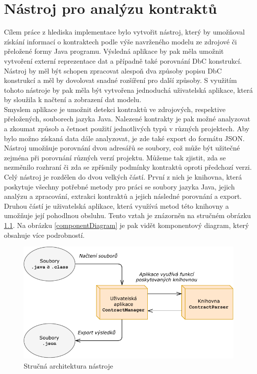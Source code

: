 \chapter{Nástroj pro analýzu kontraktů}
	Cílem práce z hlediska implementace bylo vytvořit nástroj, který by umožňoval získání informací o kontraktech podle výše navrženého modelu ze zdrojové či přeložené formy Java programu. Výsledná aplikace by pak měla umožnit vytvoření externí reprezentace dat a případně také porovnání DbC konstrukcí. Nástroj by měl být schopen zpracovat alespoň dva způsoby popisu DbC konstrukcí a měl by dovolovat snadné rozšíření pro další způsoby. S využitím tohoto nástroje by pak měla být vytvořena jednoduchá uživatelská aplikace, která by sloužila k načtení a zobrazení dat modelu.\\
	
	Smyslem aplikace je umožnit detekci kontraktů ve zdrojových, respektive přeložených, souborech jazyka Java. Nalezené kontrakty je pak možné analyzovat a zkoumat způsob a četnost použití jednotlivých typů v různých projektech. Aby bylo možno získaná data dále analyzovat, je zde také export do formátu JSON. Nástroj umožňuje porovnání dvou adresářů se soubory, což může být užitečné zejména při porovnání různých verzí projektu. Můžeme tak zjistit, zda se nezměnilo rozhraní či zda se zpřísnily podmínky kontraktů oproti předchozí verzi.\\
	
	Celý nástroj je rozdělen do dvou velkých částí. První z nich je knihovna, která poskytuje všechny potřebné metody pro práci se soubory jazyka Java, jejich analýzu a zpracování, extrakci kontraktů a jejich následné porovnání a export. Druhou částí je uživatelská aplikace, která využívá metod této knihovny a umožňuje její pohodlnou obsluhu. Tento vztah je znázorněn na stručném obrázku \ref{globalArchitecture}. Na obrázku \ref{componentDiagram} je pak vidět komponentový diagram, který obsahuje více podrobností.
					
	\begin{figure}[!htb]
			\centering
			\includegraphics{img/globalArchitecture.pdf}
			\caption[globalArchitecture]{Stručná architektura nástroje}
			\label{globalArchitecture}
		\endminipage\hfill
	\end{figure}
	
